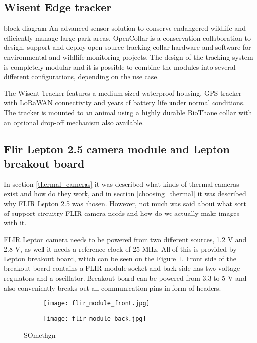 \subsection{ Wisent Edge tracker}


    block diagram
An advanced sensor solution to conserve endangered wildlife and efficiently manage large park areas. OpenCollar is a conservation collaboration to design, support and deploy open-source tracking collar hardware and software for environmental and wildlife monitoring projects. The design of the tracking system is completely modular and it is possible to combine the modules into several different configurations, depending on the use case.

The Wisent Tracker features a medium sized waterproof housing, GPS tracker with LoRaWAN connectivity and years of battery life under normal conditions. The tracker is mounted to an animal using a highly durable BioThane collar with an optional drop-off mechanism also available.





\subsection{ Flir Lepton 2.5 camera module and Lepton breakout board}

In section \ref{thermal_cameras} it was described what kinds of thermal cameras exist and how do they work, and in section \ref{choosing_thermal} it was described why FLIR Lepton 2.5 was chosen.
However, not much was said about what sort of support circuitry FLIR camera needs and how do we actually make images with it.

FLIR Lepton camera needs to be powered from two different sources, 1.2 \si{\volt} and 2.8 \si{\volt}, as well it needs a reference clock of 25 \si{\mega\hertz}.
All of this is provided by Lepton breakout board, which can be seen on the Figure \ref{lepton_breakout}.
Front side of the breakout board contains a FLIR module socket and back side has two voltage regulators and a oscillator.
Breakout board can be powered from 3.3 to 5 \si{\volt} and also conveniently breaks out all communication pins in form of headers.

\begin{figure}[ht] 
    \begin{subfigure}[b]{0.5\textwidth}
        \centering
        \texttt{[image: flir\_module\_front.jpg]} 
    \end{subfigure}
    \begin{subfigure}[b]{0.5\textwidth}
        \centering
        \texttt{[image: flir\_module\_back.jpg]} 
    \end{subfigure}
    \caption{ SOmethgn}
    \label{lepton_breakout}
\end{figure}

